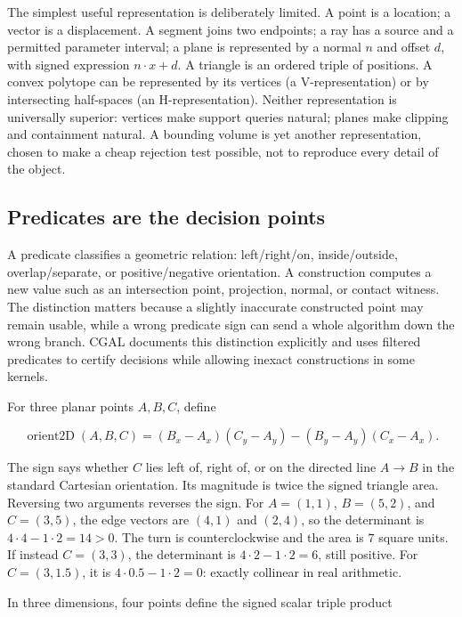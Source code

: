 The simplest useful representation is deliberately limited. A point is a location; a vector is a displacement. A segment joins two endpoints; a ray has a source and a permitted parameter interval; a plane is represented by a normal \(n\) and offset \(d\), with signed expression \(n\cdot x+d\). A triangle is an ordered triple of positions. A convex polytope can be represented by its vertices (a V-representation) or by intersecting half-spaces (an H-representation). Neither representation is universally superior: vertices make support queries natural; planes make clipping and containment natural. A bounding volume is yet another representation, chosen to make a cheap rejection test possible, not to reproduce every detail of the object.

\subsection{Predicates are the decision points}\label{03-visual-computing-i-ch020-predicates-are-the-decision-points}

A predicate classifies a geometric relation: left/right/on, inside/outside, overlap/separate, or positive/negative orientation. A construction computes a new value such as an intersection point, projection, normal, or contact witness. The distinction matters because a slightly inaccurate constructed point may remain usable, while a wrong predicate sign can send a whole algorithm down the wrong branch. CGAL documents this distinction explicitly and uses filtered predicates to certify decisions while allowing inexact constructions in some kernels.

For three planar points \(A,B,C\), define

\[
\operatorname{orient2D}(A,B,C)=(B_x-A_x)(C_y-A_y)-(B_y-A_y)(C_x-A_x).
\]

The sign says whether \(C\) lies left of, right of, or on the directed line \(A\rightarrow B\) in the standard Cartesian orientation. Its magnitude is twice the signed triangle area. Reversing two arguments reverses the sign. For \(A=(1,1)\), \(B=(5,2)\), and \(C=(3,5)\), the edge vectors are \((4,1)\) and \((2,4)\), so the determinant is \(4\cdot4-1\cdot2=14>0\). The turn is counterclockwise and the area is \(7\) square units. If instead \(C=(3,3)\), the determinant is \(4\cdot2-1\cdot2=6\), still positive. For \(C=(3,1.5)\), it is \(4\cdot0.5-1\cdot2=0\): exactly collinear in real arithmetic.

In three dimensions, four points define the signed scalar triple product

